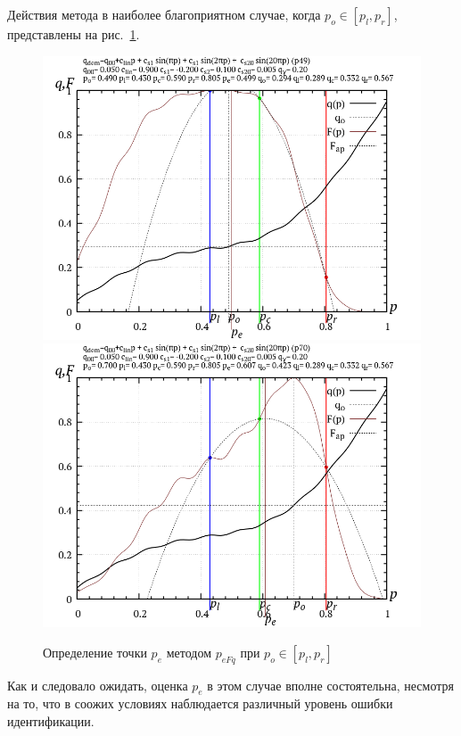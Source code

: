 Действия метода в наиболее благоприятном случае, когда
 $p_o \in [p_l,p_r]$, представлены на рис.~\ref{atu:f:p_eFq_intra}.


\begin{figure}[htb!]
  \centerline{
    \includegraphics[width=49\TW]{p/p_eFq/q_p_eFq_p49.png}
    \hfill
    \includegraphics[width=49\TW]{p/p_eFq/q_p_eFq_p70.png}
  }
  \caption{Определение точки $p_e$ методом $p_{eFq}$ при   $p_o \in [p_l,p_r]$}
  \label{atu:f:p_eFq_intra}
\end{figure}

Как и следовало ожидать, оценка $p_e$ в этом случае вполне состоятельна,
несмотря на то, что в соожих условиях
наблюдается различный уровень ошибки идентификации.


